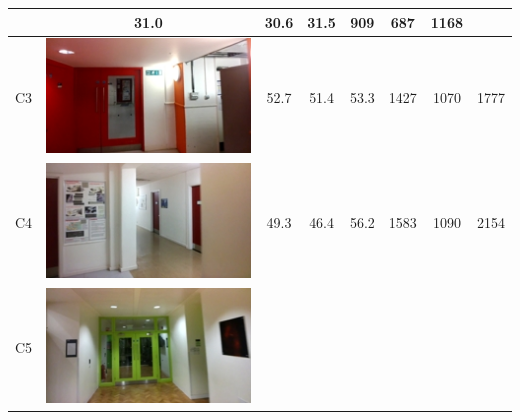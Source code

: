 \begin{table}[ht]
\begin{center}
\begin{tabular}{l c c c c c c c}
         & 31.0  & 30.6 & 31.5 & 909          & 687  & 1168 \\ \hline
    C3       & \begin{minipage}{.2\textwidth}
      			\includegraphics[width=\linewidth]{./gfx/Chapter04/table/3.jpg}
			   \end{minipage}
			        & 52.7  & 51.4 & 53.3 & 1427         & 1070 & 1777 \\ \hline
    C4       & \begin{minipage}{.2\textwidth}
      			\includegraphics[width=\linewidth]{./gfx/Chapter04/table/4.jpg}
			   \end{minipage}
			        & 49.3  & 46.4 & 56.2 & 1583         & 1090 & 2154 \\ \hline
    C5       & \begin{minipage}{.2\textwidth}
      			\includegraphics[width=\linewidth]{./gfx/Chapter04/table/5.jpg}

\end{minipage}
\end{tabular}
\end{center}
\end{table}
